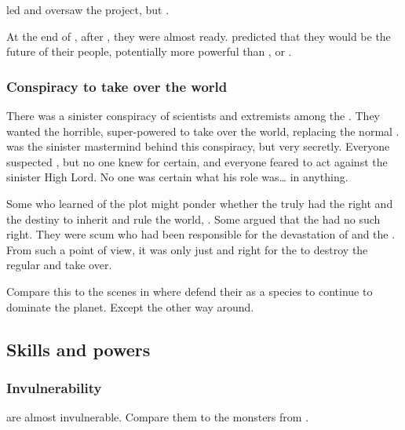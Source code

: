  led and oversaw the \neoresphan project, but . 

At the end of {\SentinelsofMithEmph}, after , they were almost ready. 
\Azraid{} predicted that they would be the future of their people, potentially more powerful than \banes, \resphain{} or \satharioth. 





\subsubsection{Conspiracy to take over the world}
There was a sinister conspiracy of scientists and extremists among the \resphain.
They wanted the horrible, super-powered \neoresphain to take over the world, replacing the normal \resphain. 
\Azraid was the sinister mastermind behind this conspiracy, but very secretly.
Everyone suspected \Azraid, but no one knew for certain, and everyone feared to act against the sinister High Lord. 
No one was certain what his role was\ldots{} in anything. 

Some \resphain who learned of the plot might ponder whether the \resphain truly had the right and the destiny to inherit and rule the world, . 
Some argued that the \resphain had no such right. 
They were scum who had been responsible for the devastation of \Miith and the .
From such a point of view, it was only just and right for the \neoresphain to destroy the regular \resphain and take over. 

Compare this to the scenes in \cite{CodyGoodfellow:RadiantDawn} where \humans defend their  as a species to continue to dominate the planet. 
Except the other way around. 









\subsection{Skills and powers}





\subsubsection{Invulnerability}
\NeoResphain are almost invulnerable.
Compare them to the monsters from \cite{CodyGoodfellow:RadiantDawn}. 





